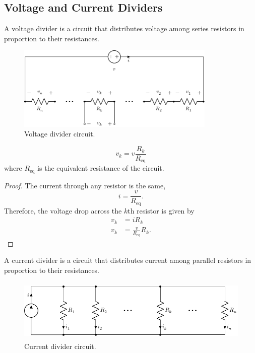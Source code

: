 \documentclass{article}
\begin{document}
\subsection{Voltage and Current Dividers}
\begin{definition}
    A voltage divider is a circuit that distributes voltage among series resistors in proportion to their resistances.
\end{definition}
\begin{figure}[H]
    \centering
    \includegraphics[height = 4cm, keepaspectratio = true]{figures/voltage_divider.pdf}
    \caption{Voltage divider circuit.}
\end{figure}
\begin{theorem}
    \begin{equation*}
        v_k = v \frac{R_k}{R_{\mathrm{eq}}}
    \end{equation*}
    where \(R_{\mathrm{eq}}\) is the equivalent resistance of the circuit.
\end{theorem}
\begin{proof}
    The current through any resistor is the same,
    \begin{equation*}
        i = \frac{v}{R_{\mathrm{eq}}}.
    \end{equation*}
    Therefore, the voltage drop across the \(k\)th resistor is given by
    \begin{align*}
        v_k & = i R_k                          \\
        v_k & = \frac{v}{R_{\mathrm{eq}}} R_k.
    \end{align*}
\end{proof}
\begin{definition}
    A current divider is a circuit that distributes current among parallel resistors in proportion to their resistances.
\end{definition}
\begin{figure}[H]
    \centering
    \includegraphics[height = 3cm, keepaspectratio = true]{figures/current_divider.pdf}
    \caption{Current divider circuit.}
\end{figure}
\end{document}
